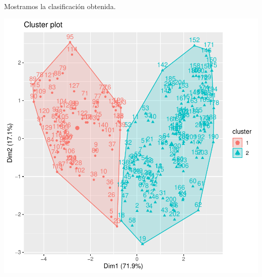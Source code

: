 \documentclass [a4paper] {article}
\begin{document}
Mostramos la clasificación obtenida.
\begin{center}
\includegraphics{entrega-kmeans_show_resultse}
\end{center}

\newpage
\end{document}
